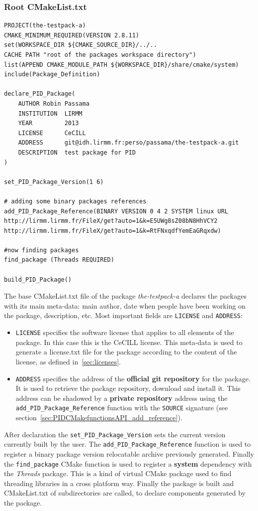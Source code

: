 \documentclass[12pt,a4paper]{article}
\begin{document}
\subsubsection{Root CMakeList.txt}

\begin{verbatim}
PROJECT(the-testpack-a)
CMAKE_MINIMUM_REQUIRED(VERSION 2.8.11)
set(WORKSPACE_DIR ${CMAKE_SOURCE_DIR}/../.. 
CACHE PATH "root of the packages workspace directory")
list(APPEND CMAKE_MODULE_PATH ${WORKSPACE_DIR}/share/cmake/system)
include(Package_Definition)

declare_PID_Package(	
    AUTHOR Robin Passama
    INSTITUTION  LIRMM 
    YEAR         2013 
    LICENSE      CeCILL
    ADDRESS      git@idh.lirmm.fr:perso/passama/the-testpack-a.git
    DESCRIPTION  test package for PID
)

set_PID_Package_Version(1 6)

# adding some binary packages references
add_PID_Package_Reference(BINARY VERSION 0 4 2 SYSTEM linux URL
http://lirmm.lirmm.fr/FileX/get?auto=1&k=E5UWg8sZ08bN8HhVCY2
http://lirmm.lirmm.fr/FileX/get?auto=1&k=RtFNxqdfYemEaGRqxdw)

#now finding packages
find_package (Threads REQUIRED)

build_PID_Package()
\end{verbatim}

The base CMakeList.txt file of the package \textit{the-testpack-a} declares the packages with its main meta-data: main author, date when people have been working on the package, description, etc. Most important fields are \texttt{LICENSE} and \texttt{ADDRESS}:
\begin{itemize}
\item \texttt{LICENSE} specifies the software license that applies to all elements of the package. In this case this is the CeCILL license. This meta-data is used to generate a license.txt file for the package according to the content of the license, as defined in~\ref{sec:licenses}.
\item \texttt{ADDRESS} specifies the address of the \textbf{official git repository} for the package. It is used to retrieve the package repository, download and install it. This address can be shadowed by a \textbf{private repository} address using the \texttt{add\_PID\_Package\_Reference} function with the \texttt{SOURCE} signature (see section~\ref{sec:PIDCMakefunctionsAPI_add_reference}).
\end{itemize}

After declaration the \texttt{set\_PID\_Package\_Version} sets the current version currently built by the user. The \texttt{add\_PID\_Package\_Reference} function is used to register a binary package version relocatable archive previously generated. Finally the \texttt{find\_package} CMake function is used to register a \textbf{system} dependency with the \textit{Threads} package. This is a kind of virtual CMake package used to find threading libraries in a cross platform way. Finally the package is built and CMakeList.txt of subdirectories are called, to declare components generated by the package.
\end{document}
